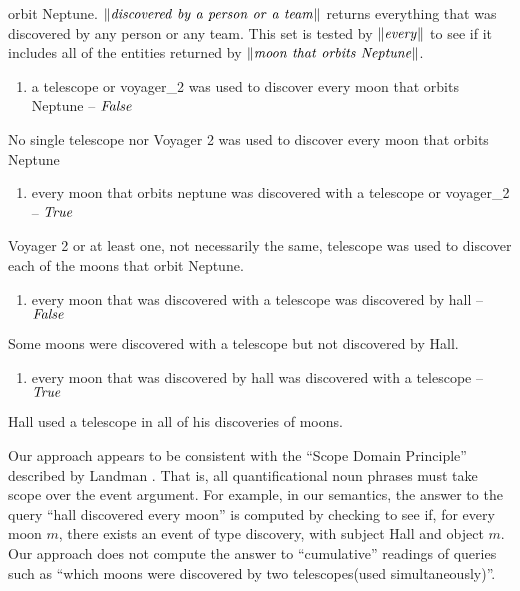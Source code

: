 \documentclass[../main.tex]{subfiles}
\begin{document}
\begin{refsection}
orbit Neptune. $\meaningof{discovered\ by\ a\ person\ or\ a\ team}$ returns everything that was discovered by any
person or any team. This set is tested by $\lVert \mathit{every} \rVert$ to see if it includes all of the entities returned by
$\meaningof{moon\ that\ orbits\ Neptune}$.
\begin{enumerate}[before=\small, label=\alph*.]
	\setlength\itemsep{0em}
	\setcounter{enumi}{3}
	\item a telescope or voyager\_2 was used to discover every moon that orbits Neptune – $\mathit{False}$
\end{enumerate}
\noindent No single telescope nor Voyager 2 was used to discover every moon that orbits Neptune
\begin{enumerate}[before=\small, label=\alph*.]
	\setlength\itemsep{0em}
	\setcounter{enumi}{4}
	\item every moon that orbits neptune was discovered with a telescope or voyager\_2 – $\mathit{True}$
\end{enumerate}
\noindent Voyager 2 or at least one, not necessarily the same, telescope was used to discover each of the moons
that orbit Neptune.
\begin{enumerate}[before=\small, label=\alph*.]
	\setlength\itemsep{0em}
	\setcounter{enumi}{5}
	\item every moon  that was discovered  with a telescope was discovered by hall – $\mathit{False}$
\end{enumerate}
\noindent  Some moons were discovered with a telescope but not discovered by Hall.
\begin{enumerate}[before=\small, label=\alph*.]
	\setlength\itemsep{0em}
	\setcounter{enumi}{6}
	\item every moon  that was discovered by hall was discovered with a telescope – $\mathit{True}$
\end{enumerate}
\noindent Hall used a telescope in all of his discoveries of moons.

Our approach appears to be consistent with the ``Scope Domain Principle'' described by Landman \cite{landman1996plurality}. That is, all
quantificational noun phrases must take scope over the event argument. For example, in our semantics,
the answer to the query ``hall discovered every moon'' is computed by checking to see if, for every moon
$m$, there exists an event of type discovery, with subject Hall and object $m$. Our approach does not
compute the answer to ``cumulative'' readings of queries such as ``which moons were discovered by two
telescopes(used simultaneously)''.


\end{refsection}
\end{document}
